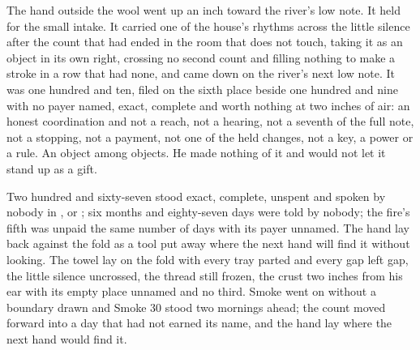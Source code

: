 The hand outside the wool went up an inch toward the river's low note. It held for the small intake. It carried one of the house's rhythms across the little silence after the count that had ended in the room that does not touch, taking it as an object in its own right, crossing no second count and filling nothing to make a stroke in a row that had none, and came down on the river's next low note. It was one hundred and ten, filed on the sixth place beside one hundred and nine with no payer named, exact, complete and worth nothing at two inches of air: an honest coordination and not a reach, not a hearing, not a seventh of the full note, not a stopping, not a payment, not one of the held changes, not a key, a power or a rule. An object among objects. He made nothing of it and would not let it stand up as a gift.

Two hundred and sixty-seven stood exact, complete, unspent and spoken by nobody in ,  or ; six months and eighty-seven days were told by nobody; the fire's fifth was unpaid the same number of days with its payer unnamed. The hand lay back against the fold as a tool put away where the next hand will find it without looking. The towel lay on the fold with every tray parted and every gap left gap, the little silence uncrossed, the thread still frozen, the crust two inches from his ear with its empty place unnamed and no third. Smoke went on without a boundary drawn and Smoke 30 stood two mornings ahead; the count moved forward into a day that had not earned its name, and the hand lay where the next hand would find it.
